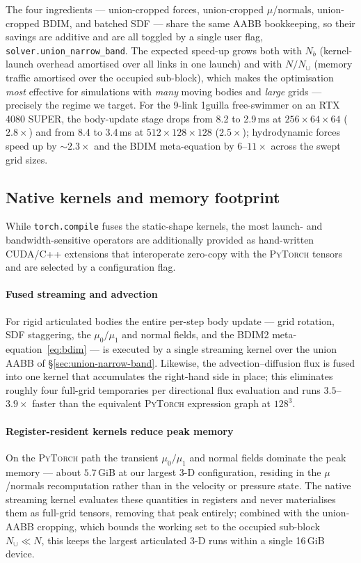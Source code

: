 \documentclass[journal,twoside,10pt]{IEEEtran}
\newcommand{\pytorch}{\textsc{PyTorch}\xspace}
\begin{document}
The four ingredients --- union-cropped forces, union-cropped
$\mu$/normals, union-cropped BDIM, and batched SDF --- share the same
AABB bookkeeping, so their savings are additive and are all toggled
by a single user flag, \texttt{solver.union\_narrow\_band}.  The
expected speed-up grows both with $N_b$ (kernel-launch overhead
amortised over all links in one launch) and with $N/N_\cup$ (memory
traffic amortised over the occupied sub-block), which makes the
optimisation \emph{most} effective for simulations with \emph{many}
moving bodies and \emph{large} grids --- precisely the regime we
target.  For the 9-link 1guilla free-swimmer on an RTX 4080 SUPER,
the body-update stage drops from 8.2 to 2.9\,ms at
$256{\times}64{\times}64$ ($2.8\times$) and from 8.4 to
3.4\,ms at $512{\times}128{\times}128$ ($2.5\times$); hydrodynamic
forces speed up by $\sim\!2.3\times$ and the BDIM meta-equation by
$6$--$11\times$ across the swept grid sizes.


\subsection{Native kernels and memory footprint}\label{sec:native}

While \texttt{torch.compile} fuses the static-shape kernels, the most
launch- and bandwidth-sensitive operators are additionally provided as
hand-written CUDA/C++ extensions that interoperate zero-copy with the
\pytorch tensors and are selected by a configuration flag.

\paragraph{Fused streaming and advection}
For rigid articulated bodies the entire per-step body update --- grid
rotation, SDF staggering, the $\mu_0/\mu_1$ and normal fields, and the
BDIM2 meta-equation~\eqref{eq:bdim} --- is executed by a single
streaming kernel over the union AABB of
§\ref{sec:union-narrow-band}.  Likewise, the advection--diffusion flux
is fused into one kernel that accumulates the right-hand side in place;
this eliminates roughly four full-grid temporaries per directional flux
evaluation and runs $3.5$--$3.9\times$ faster than the equivalent
\pytorch expression graph at $128^3$.

\paragraph{Register-resident kernels reduce peak memory}
On the \pytorch path the transient $\mu_0/\mu_1$ and normal fields
dominate the peak memory --- about $5.7$\,GiB at our largest 3-D
configuration, residing in the $\mu$/normals recomputation rather than
in the velocity or pressure state.  The native streaming kernel
evaluates these quantities in registers and never materialises them as
full-grid tensors, removing that peak entirely; combined with the
union-AABB cropping, which bounds the working set to the occupied
sub-block $N_\cup\!\ll\!N$, this keeps the largest articulated 3-D runs
within a single 16\,GiB device.
\end{document}
